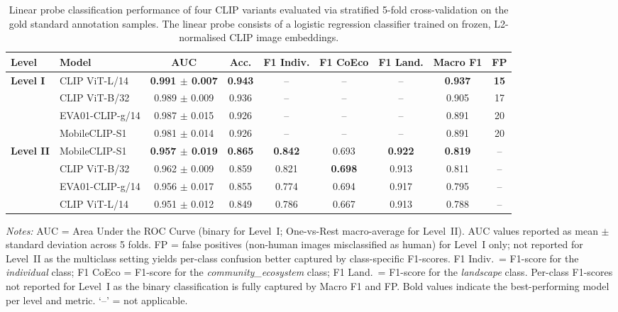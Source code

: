 \documentclass[hidelinks, 11pt]{article}
\begin{document}
\begin{table}[h]
\centering
\caption{Linear probe classification performance of four CLIP variants
evaluated via stratified 5-fold cross-validation on the gold standard
annotation samples. The linear probe consists of a logistic regression
classifier trained on frozen, L2-normalised CLIP image embeddings.}
\label{tab:linear_probe_comparison}
\begin{tabular}{llccccccc}
\hline
\textbf{Level} & \textbf{Model} & \textbf{AUC} & \textbf{Acc.} & \textbf{F1 Indiv.} & \textbf{F1 CoEco} & \textbf{F1 Land.} & \textbf{Macro F1} & \textbf{FP} \\
\hline
\multirow{4}{*}{\textbf{Level I}}
    & CLIP ViT-L/14   & \textbf{0.991 $\pm$ 0.007} & \textbf{0.943} & --             & --             & --             & \textbf{0.937} & \textbf{15} \\
    & CLIP ViT-B/32   & 0.989 $\pm$ 0.009          & 0.936          & --             & --             & --             & 0.905          & 17          \\
    & EVA01-CLIP-g/14 & 0.987 $\pm$ 0.015          & 0.926          & --             & --             & --             & 0.891          & 20          \\
    & MobileCLIP-S1   & 0.981 $\pm$ 0.014          & 0.926          & --             & --             & --             & 0.891          & 20          \\
\hline
\multirow{4}{*}{\textbf{Level II}}
    & MobileCLIP-S1   & \textbf{0.957 $\pm$ 0.019} & \textbf{0.865} & \textbf{0.842} & 0.693          & \textbf{0.922} & \textbf{0.819} & -- \\
    & CLIP ViT-B/32   & 0.962 $\pm$ 0.009          & 0.859          & 0.821          & \textbf{0.698} & 0.913          & 0.811          & -- \\
    & EVA01-CLIP-g/14 & 0.956 $\pm$ 0.017          & 0.855          & 0.774          & 0.694          & 0.917          & 0.795          & -- \\
    & CLIP ViT-L/14   & 0.951 $\pm$ 0.012          & 0.849          & 0.786          & 0.667          & 0.913          & 0.788          & -- \\
\hline
\end{tabular}
\begin{minipage}{\textwidth}
\bigskip\raggedright\small
\textit{Notes:} AUC = Area Under the ROC Curve (binary for Level~I;
One-vs-Rest macro-average for Level~II). AUC values reported as mean
$\pm$ standard deviation across 5 folds. FP = false positives
(non-human images misclassified as human) for Level~I only; not
reported for Level~II as the multiclass setting yields per-class
confusion better captured by class-specific F1-scores.
F1 Indiv.\ = F1-score for the \textit{individual} class;
F1 CoEco = F1-score for the \textit{community\_ecosystem} class;
F1 Land.\ = F1-score for the \textit{landscape} class.
Per-class F1-scores not reported for Level~I as the binary
classification is fully captured by Macro F1 and FP.
Bold values indicate the best-performing model per level and metric.
`--' = not applicable.
\end{minipage}
\end{table}
\end{document}
